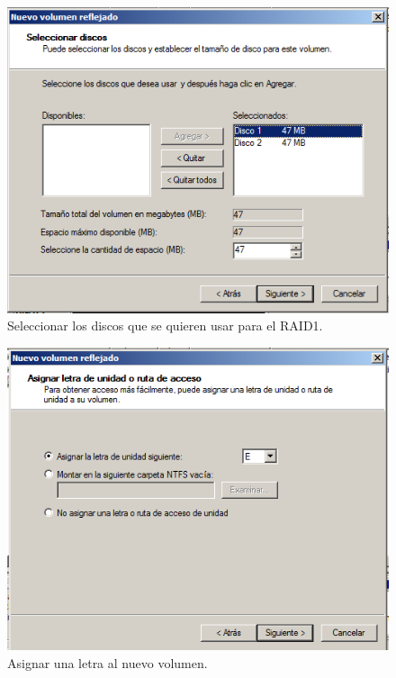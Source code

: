 \begin{figure}[H]
    \begin{center}
        \includegraphics[scale=0.6]{Imagenes/paso5}
        \caption{Seleccionar los discos que se quieren usar para el RAID1.}
        \label{fig14}
    \end{center}
\end{figure}

\begin{figure}[H]
    \begin{center}
        \includegraphics[scale=0.6]{Imagenes/paso6}
        \caption{Asignar una letra al nuevo volumen.}
        \label{fig15}
    \end{center}
\end{figure}

